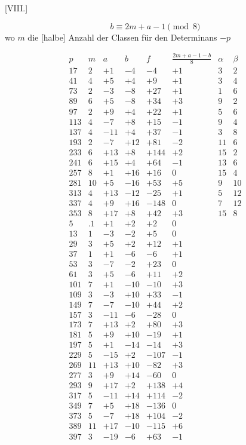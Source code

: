 \par\bigskip{}\centerline{[VIII.]}\medskip
\[
b\equiv2m+a-1\pmod8
\]
wo $m$ die [halbe] Anzahl der Classen für den Determinans $-p$

\begingroup\small
\[
\begin{array}{r|r|r|r|r|r|r|r}
p&m&a&b&f&\frac{2m+a-1-b}8&\alpha&\beta\\\hline
17&2&+1&-4&-4&+1&3&2\\
41&4&+5&+4&+9&+1&3&4\\
73&2&-3&-8&+27&+1&1&6\\
89&6&+5&-8&+34&+3&9&2\\
97&2&+9&+4&+22&+1&5&6\\
113&4&-7&+8&+15&-1&9&4\\
137&4&-11&+4&+37&-1&3&8\\
193&2&-7&+12&+81&-2&11&6\\
233&6&+13&+8&+144&+2&15&2\\
241&6&+15&+4&+64&-1&13&6\\
257&8&+1&+16&+16&0&15&4\\
281&10&+5&-16&+53&+5&9&10\\
313&4&+13&-12&-25&+1&5&12\\
337&4&+9&+16&-148&0&7&12\\
353&8&+17&+8&+42&+3&15&8\\
5&.1&+1&+2&+2&0&&\\
13&1&-3&-2&+5&0&&\\
29&3&+5&+2&+12&+1&&\\
37&1&+1&-6&-6&+1&&\\
53&3&-7&-2&+23&0&&\\
61&3&+5&-6&+11&+2&&\\
101&7&+1&-10&-10&+3&&\\
109&3&-3&+10&+33&-1&&\\
149&7&-7&-10&+44&+2&&\\
157&3&-11&-6&-28&0&&\\
173&7&+13&+2&+80&+3&&\\
181&5&+9&+10&-19&+1&&\\
197&5&+1&-14&-14&+3&&\\
229&5&-15&+2&-107&-1&&\\
269&11&+13&+10&-82&+3&&\\
277&3&+9&+14&-60&0&&\\
293&9&+17&+2&+138&+4&&\\
317&5&-11&+14&+114&-2&&\\
349&7&+5&+18&-136&0&&\\
373&5&-7&+18&+104&-2&&\\
389&11&+17&-10&-115&+6&&\\
397&3&-19&-6&+63&-1&&
\end{array}
\]
\endgroup
{}
